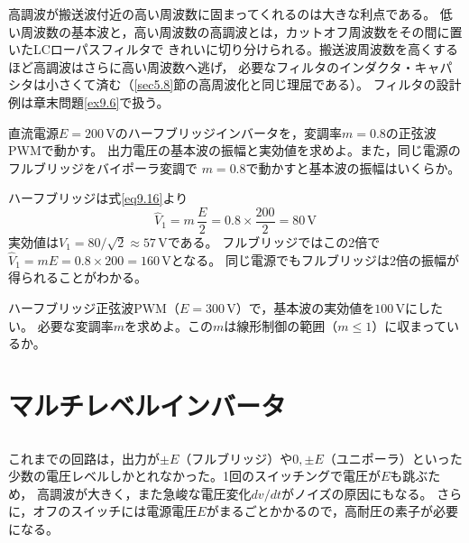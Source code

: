 高調波が搬送波付近の高い周波数に固まってくれるのは大きな利点である。
低い周波数の基本波と，高い周波数の高調波とは，カットオフ周波数をその間に置いたLCローパスフィルタで
きれいに切り分けられる。搬送波周波数を高くするほど高調波はさらに高い周波数へ逃げ，
必要なフィルタのインダクタ・キャパシタは小さくて済む（\ref{sec5.8}節の高周波化と同じ理屈である）。
フィルタの設計例は章末問題\ref{ex9.6}で扱う。

\begin{例題}[変調率と基本波の振幅]
\label{rei9.1}
直流電源$E = 200$\,Vのハーフブリッジインバータを，変調率$m = 0.8$の正弦波PWMで動かす。
出力電圧の基本波の振幅と実効値を求めよ。また，同じ電源のフルブリッジをバイポーラ変調で
$m = 0.8$で動かすと基本波の振幅はいくらか。
\begin{解答}
ハーフブリッジは式\ref{eq9.16}より
\begin{equation*}
\hat{V}_1 = m\,\frac{E}{2} = 0.8 \times \frac{200}{2} = 80\,\mathrm{V}
\end{equation*}
実効値は$V_1 = 80/\sqrt{2} \approx 57\,\mathrm{V}$である。
フルブリッジではこの2倍で$\hat{V}_1 = mE = 0.8 \times 200 = 160\,\mathrm{V}$となる。
同じ電源でもフルブリッジは2倍の振幅が得られることがわかる。
\end{解答}
\end{例題}

\begin{問}
\item ハーフブリッジ正弦波PWM（$E = 300$\,V）で，基本波の実効値を$100$\,Vにしたい。
必要な変調率$m$を求めよ。この$m$は線形制御の範囲（$m \le 1$）に収まっているか。
\end{問}


\section{マルチレベルインバータ}
\label{sec9.6}

\subsection{}

これまでの回路は，出力が$\pm E$（フルブリッジ）や$0, \pm E$（ユニポーラ）といった
少数の電圧レベルしかとれなかった。1回のスイッチングで電圧が$E$も跳ぶため，
高調波が大きく，また急峻な電圧変化$dv/dt$がノイズの原因にもなる。
さらに，オフのスイッチには電源電圧$E$がまるごとかかるので，高耐圧の素子が必要になる。

